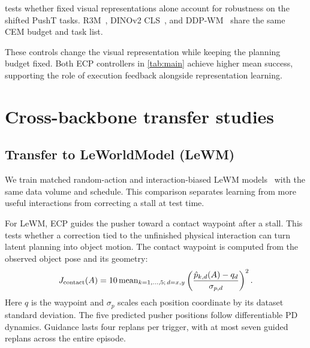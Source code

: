 \makeatletter
\setlength{\@fptop}{0pt}
\setlength{\@dblfptop}{0pt}
\makeatother
\clearpage
\begin{table}[!t]
\par\smallskip
\noindent \begin{minipage}[t]{\columnwidth}
\vspace{0pt}
 tests whether fixed visual representations alone account for robustness on the shifted PushT tasks. R3M~\cite{nair2022r3m}, DINOv2 CLS~\cite{oquab2024dinov2}, and DDP-WM~\cite{yin2026ddpwm} share the same CEM budget and task list.\par\smallskip
\normalsize
These controls change the visual representation while keeping the planning budget fixed. Both ECP controllers in \cref{tab:main} achieve higher mean success, supporting the role of execution feedback alongside representation learning.\par
\end{minipage}\hfill
\begin{minipage}[t]{\columnwidth}
\vspace{0pt}
\par\smallskip
{\centering
\centering

\par}
\end{minipage}\par
\par\smallskip
\noindent \begin{minipage}[t]{\columnwidth}
\vspace{0pt}
\section{Cross-backbone transfer studies}
\label{sec:backbone}
\subsection{Transfer to LeWorldModel (LeWM)}
We train matched random-action and interaction-biased LeWM models~\cite{maes2026lewm} with the same data volume and schedule. This comparison separates learning from more useful interactions from correcting a stall at test time.\par\smallskip
\normalsize
For LeWM, ECP guides the pusher toward a contact waypoint after a stall. This tests whether a correction tied to the unfinished physical interaction can turn latent planning into object motion. The contact waypoint is computed from the observed object pose and its geometry:
\[
 J_{\rm contact}(A)=10\operatorname{mean}_{k=1,\ldots,5;\,d=x,y}
 \left(\frac{\hat p_{k,d}(A)-q_d}{\sigma_{p,d}}\right)^2.
\]
Here $q$ is the waypoint and $\sigma_p$ scales each position coordinate by its dataset standard deviation. The five predicted pusher positions follow differentiable PD dynamics. Guidance lasts four replans per trigger, with at most seven guided replans across the entire episode.


\end{minipage}
\end{table}
